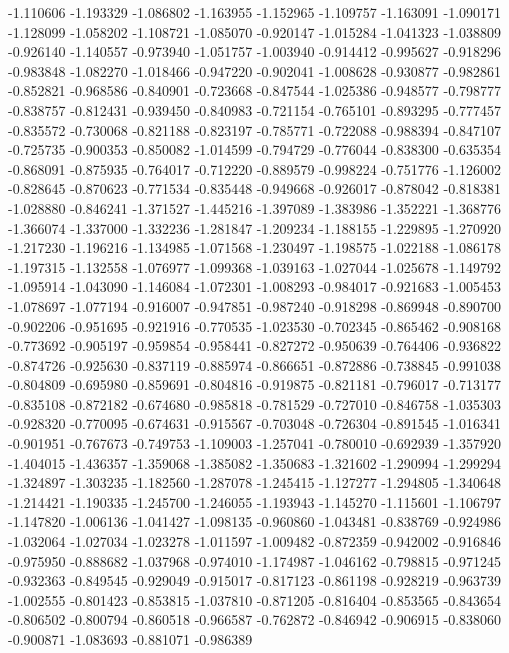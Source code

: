 -1.110606
-1.193329
-1.086802
-1.163955
-1.152965
-1.109757
-1.163091
-1.090171
-1.128099
-1.058202
-1.108721
-1.085070
-0.920147
-1.015284
-1.041323
-1.038809
-0.926140
-1.140557
-0.973940
-1.051757
-1.003940
-0.914412
-0.995627
-0.918296
-0.983848
-1.082270
-1.018466
-0.947220
-0.902041
-1.008628
-0.930877
-0.982861
-0.852821
-0.968586
-0.840901
-0.723668
-0.847544
-1.025386
-0.948577
-0.798777
-0.838757
-0.812431
-0.939450
-0.840983
-0.721154
-0.765101
-0.893295
-0.777457
-0.835572
-0.730068
-0.821188
-0.823197
-0.785771
-0.722088
-0.988394
-0.847107
-0.725735
-0.900353
-0.850082
-1.014599
-0.794729
-0.776044
-0.838300
-0.635354
-0.868091
-0.875935
-0.764017
-0.712220
-0.889579
-0.998224
-0.751776
-1.126002
-0.828645
-0.870623
-0.771534
-0.835448
-0.949668
-0.926017
-0.878042
-0.818381
-1.028880
-0.846241
-1.371527
-1.445216
-1.397089
-1.383986
-1.352221
-1.368776
-1.366074
-1.337000
-1.332236
-1.281847
-1.209234
-1.188155
-1.229895
-1.270920
-1.217230
-1.196216
-1.134985
-1.071568
-1.230497
-1.198575
-1.022188
-1.086178
-1.197315
-1.132558
-1.076977
-1.099368
-1.039163
-1.027044
-1.025678
-1.149792
-1.095914
-1.043090
-1.146084
-1.072301
-1.008293
-0.984017
-0.921683
-1.005453
-1.078697
-1.077194
-0.916007
-0.947851
-0.987240
-0.918298
-0.869948
-0.890700
-0.902206
-0.951695
-0.921916
-0.770535
-1.023530
-0.702345
-0.865462
-0.908168
-0.773692
-0.905197
-0.959854
-0.958441
-0.827272
-0.950639
-0.764406
-0.936822
-0.874726
-0.925630
-0.837119
-0.885974
-0.866651
-0.872886
-0.738845
-0.991038
-0.804809
-0.695980
-0.859691
-0.804816
-0.919875
-0.821181
-0.796017
-0.713177
-0.835108
-0.872182
-0.674680
-0.985818
-0.781529
-0.727010
-0.846758
-1.035303
-0.928320
-0.770095
-0.674631
-0.915567
-0.703048
-0.726304
-0.891545
-1.016341
-0.901951
-0.767673
-0.749753
-1.109003
-1.257041
-0.780010
-0.692939
-1.357920
-1.404015
-1.436357
-1.359068
-1.385082
-1.350683
-1.321602
-1.290994
-1.299294
-1.324897
-1.303235
-1.182560
-1.287078
-1.245415
-1.127277
-1.294805
-1.340648
-1.214421
-1.190335
-1.245700
-1.246055
-1.193943
-1.145270
-1.115601
-1.106797
-1.147820
-1.006136
-1.041427
-1.098135
-0.960860
-1.043481
-0.838769
-0.924986
-1.032064
-1.027034
-1.023278
-1.011597
-1.009482
-0.872359
-0.942002
-0.916846
-0.975950
-0.888682
-1.037968
-0.974010
-1.174987
-1.046162
-0.798815
-0.971245
-0.932363
-0.849545
-0.929049
-0.915017
-0.817123
-0.861198
-0.928219
-0.963739
-1.002555
-0.801423
-0.853815
-1.037810
-0.871205
-0.816404
-0.853565
-0.843654
-0.806502
-0.800794
-0.860518
-0.966587
-0.762872
-0.846942
-0.906915
-0.838060
-0.900871
-1.083693
-0.881071
-0.986389
